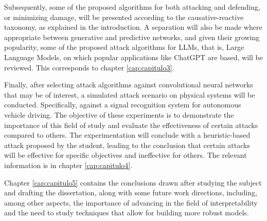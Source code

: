 Subsequently, some of the proposed algorithms for both attacking and defending, or minimizing damage, will be presented according to the causative-reactive taxonomy, as explained in the introduction. A separation will also be made where appropriate between generative and predictive networks, and given their growing popularity, some of the proposed attack algorithms for LLMs, that is, Large Language Models, on which popular applications like ChatGPT are based, will be reviewed. This corresponds to chapter \ref{cap:capitulo3}.

Finally, after selecting attack algorithms against convolutional neural networks that may be of interest, a simulated attack scenario on physical systems will be conducted. Specifically, against a signal recognition system for autonomous vehicle driving. The objective of these experiments is to demonstrate the importance of this field of study and evaluate the effectiveness of certain attacks compared to others. The experimentation will conclude with a heuristic-based attack proposed by the student, leading to the conclusion that certain attacks will be effective for specific objectives and ineffective for others. The relevant information is in chapter \ref{cap:capitulo4}.

Chapter \ref{cap:capitulo5} contains the conclusions drawn after studying the subject and drafting the dissertation, along with some future work directions, including, among other aspects, the importance of advancing in the field of interpretability and the need to study techniques that allow for building more robust models.



\endinput
